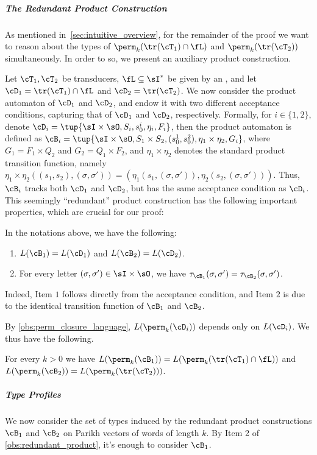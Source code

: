 \subparagraph*{The Redundant Product Construction}
As mentioned in~\cref{sec:intuitive_overview}, for the remainder of the proof we want to reason about the types of $\perm_k(\tr(\cT_1)\cap \fL)$ and $\perm_k(\tr(\cT_2))$ simultaneously. In order to so, we present an auxiliary product construction.

Let $\cT_1,\cT_2$ be transducers, $\fL\subseteq \sI^*$ be given by an \NFA, and let $\cD_1=\tr(\cT_1)\cap \fL$ and $\cD_2=\tr(\cT_2)$. 
We now consider the product automaton of $\cD_1$ and $\cD_2$, and endow it with two different acceptance conditions, capturing that of $\cD_1$ and $\cD_2$, respectively. Formally, for $i\in \{1,2\}$, denote $\cD_i=\tup{\sI\times\sO,S_i,s^i_0,\eta_i,F_i}$, then the product automaton is defined as $\cB_i=\tup{\sI\times\sO,S_1\times S_2,(s^1_0,s^2_0),\eta_1\times \eta_2,G_i}$, where $G_1=F_1\times Q_2$ and $G_2=Q_1\times F_2$, and $\eta_1\times \eta_2$ denotes the standard product transition function, namely $\eta_1\times\eta_2((s_1,s_2),(\sigma,\sigma'))=(\eta_1(s_1,(\sigma,\sigma')),\eta_2(s_2,(\sigma,\sigma')))$. Thus, $\cB_i$ tracks both $\cD_1$ and $\cD_2$, but has the same acceptance condition as $\cD_i$. This seemingly ``redundant'' product construction has the following important properties, which are crucial for our proof:
\begin{observation}
	\label{obs:redundant_product}
 In the notations above, we have the following:
	\begin{enumerate}
		\item $L(\cB_1)=L(\cD_1)$ and $L(\cB_2)=L(\cD_2)$.
		\item For every letter $(\sigma,\sigma')\in \sI\times\sO$, we have $\tau_{\cB_1}(\sigma,\sigma')=\tau_{\cB_2}(\sigma,\sigma')$.
	\end{enumerate}
	\end{observation}
	
Indeed, Item $1$ follows directly from the acceptance condition, and Item $2$ is due to the identical transition function of $\cB_1$ and $\cB_2$.

By \cref{obs:perm_closure_language}, $L(\perm_k(\cD_i))$ depends only on $L(\cD_i)$. We thus have the following.
\begin{observation}
	\label{obs:redundant_product_for_perm_automata}
	 For every $k>0$
	  we have 
	 $L(\perm_k(\cB_1))=L(\perm_k(\tr(\cT_1)\cap \fL))$ and $L(\perm_k(\cB_2))=L(\perm_k(\tr(\cT_2)))$.
	\end{observation}

\subparagraph*{Type Profiles}
We now consider the set of types induced by the redundant product constructions $\cB_1$ and $\cB_2$ on Parikh vectors of words of length $k$. By Item 2 of \cref{obs:redundant_product}, it's enough to consider $\cB_1$. 

